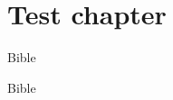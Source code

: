 \documentclass[twoside,14pt,onecolumn,openright ,a4paper]{memoir}
\begin{document}
\chapter{Test chapter}
\begin{pairs}
  \begin{Leftside}
    \beginnumbering
    \pstart
    \lipsum[1] Bible
    \lipsum[1]
    \pend
    \endnumbering
  \end{Leftside}
  \begin{Rightside}
    \beginnumbering
    \pstart
    \lipsum[1] Bible
    \lipsum[1]
    \pend
    \endnumbering
  \end{Rightside}
\end{pairs}
\Columns 
\backmatter 
\printindex[bible]
\end{document}

